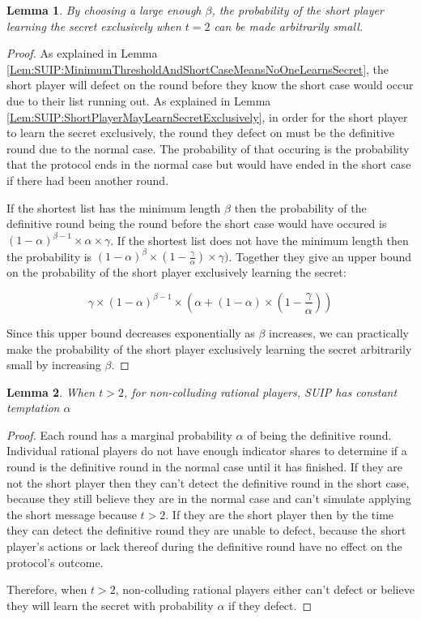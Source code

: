\documentclass{dalcsthesis}
\newtheorem{lemma}{Lemma}
\begin{document}
\begin{lemma} By choosing a large enough $\beta$, the probability of the short player learning the secret exclusively when $t=2$ can be made arbitrarily small. \label{Lem:SUIP:ShortPlayerLearningSecretExclusivelyIsReducible} \end{lemma} 
\begin{proof}
As explained in Lemma \ref{Lem:SUIP:MinimumThresholdAndShortCaseMeansNoOneLearnsSecret}, the short player will defect on the round before they know the short case would occur due to their list running out. As explained in Lemma \ref{Lem:SUIP:ShortPlayerMayLearnSecretExclusively}, in order for the short player to learn the secret exclusively, the round they defect on must be the definitive round due to the normal case. The probability of that occuring is the probability that the protocol ends in the normal case but would have ended in the short case if there had been another round.

If the shortest list has the minimum length $\beta$ then the probability of the definitive round being the round before the short case would have occured is $(1-\alpha)^{\beta-1} \times \alpha \times \gamma$. If the shortest list does not have the minimum length then the probability is $(1-\alpha)^\beta \times (1 - \frac{\gamma}{\alpha}) \times \gamma)$. Together they give an upper bound on the probability of the short player exclusively learning the secret:

$$\gamma \times (1-\alpha)^{\beta-1} \times (\alpha + (1-\alpha) \times (1 - \frac{\gamma}{\alpha}))$$

Since this upper bound decreases exponentially as $\beta$ increases, we can practically make the probability of the short player exclusively learning the secret arbitrarily small by increasing $\beta$.
\end{proof}

\begin{lemma} When $t > 2$, for non-colluding rational players, SUIP has constant temptation $\alpha$ \label{Lem:SUIP:NonColludersNotTemptedExceptT2} \end{lemma}
\begin{proof}
Each round has a marginal probability $\alpha$ of being the definitive round. Individual rational players do not have enough indicator shares to determine if a round is the definitive round in the normal case until it has finished. If they are not the short player then they can't detect the definitive round in the short case, because they still believe they are in the normal case and can't simulate applying the short message because $t > 2$. If they are the short player then by the time they can detect the definitive round they are unable to defect, because the short player's actions or lack thereof during the definitive round have no effect on the protocol's outcome.

Therefore, when $t > 2$, non-colluding rational players either can't defect or believe they will learn the secret with probability $\alpha$ if they defect.
\end{proof}
\end{document}
